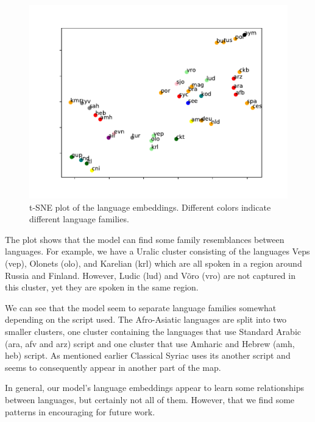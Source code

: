 \documentclass[11pt,a4paper]{article}
\begin{document}
\begin{figure}[ht]
\centering
\includegraphics[scale=0.5]{lang_tsne.pdf}
\caption{\label{fig:lang_tsne} t-SNE plot of the language
embeddings. Different colors indicate different language families.}
\end{figure}

The plot shows that the model can find some family resemblances
between languages. For example, we have a Uralic cluster consisting of
the languages Veps (vep), Olonets (olo), and Karelian (krl) which are
all spoken in a region around Russia and Finland. However, Ludic (lud)
and V\~{o}ro (vro) are not captured in this cluster, yet they are
spoken in the same region.


We can see that the model seem to separate language families somewhat
depending on the script used. The Afro-Asiatic languages are split
into two smaller clusters, one cluster containing the languages that
use Standard Arabic (ara, afv and arz) script and one cluster that use
Amharic and Hebrew (amh, heb) script. As mentioned earlier Classical
Syriac uses its another script and seems to consequently appear in
another part of the map.

In general, our model's language embeddings appear to learn some
relationships between languages, but certainly not all of
them. However, that we find some patterns in encouraging for future
work.
\end{document}
